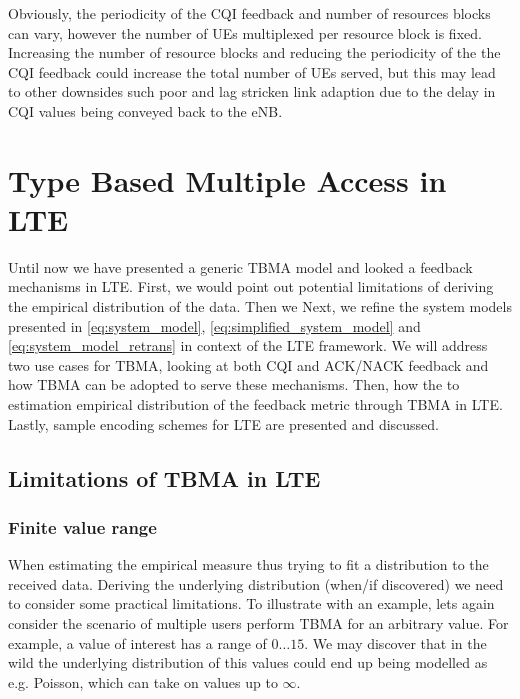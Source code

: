 \documentclass{article}
\begin{document}
Obviously, the periodicity of the CQI feedback and number of resources blocks can vary, however the number of UEs multiplexed per resource block is fixed. Increasing the number of resource blocks and reducing the periodicity of the the CQI feedback could increase the total number of UEs served, but this may lead to other downsides such poor and lag stricken link adaption due to the delay in CQI values being conveyed back to the \ac{eNB}.
\newpage
\section{Type Based Multiple Access in LTE}\label{tbma_sec}
Until now we have presented a generic \ac{TBMA} model and looked a feedback mechanisms in LTE. First, we would point out potential limitations of deriving the empirical distribution of the data. Then we  Next, we refine the system models presented in \cref{eq:system_model}, \cref{eq:simplified_system_model} and \cref{eq:system_model_retrans} in context of the LTE framework. We will address two use cases for \ac{TBMA}, looking at both CQI and ACK/NACK feedback and how \ac{TBMA} can be adopted to serve these mechanisms. Then, how the to estimation empirical distribution of the feedback metric through TBMA in LTE. Lastly, sample encoding schemes for LTE are presented and discussed. 

\subsection{Limitations of TBMA in LTE}
\subsubsection{Finite value range}
When estimating the empirical measure thus trying to fit a distribution to the received data. Deriving the underlying distribution (when/if discovered) we need to consider some practical limitations. To illustrate with an example, lets again consider the scenario of multiple users perform \ac{TBMA} for an arbitrary value. For example, a value of interest has a range of $0 \dots 15$. We may discover that in the wild the underlying distribution of this values could end up being modelled as e.g. Poisson, which can take on values up to $\infty$. 
\end{document}
